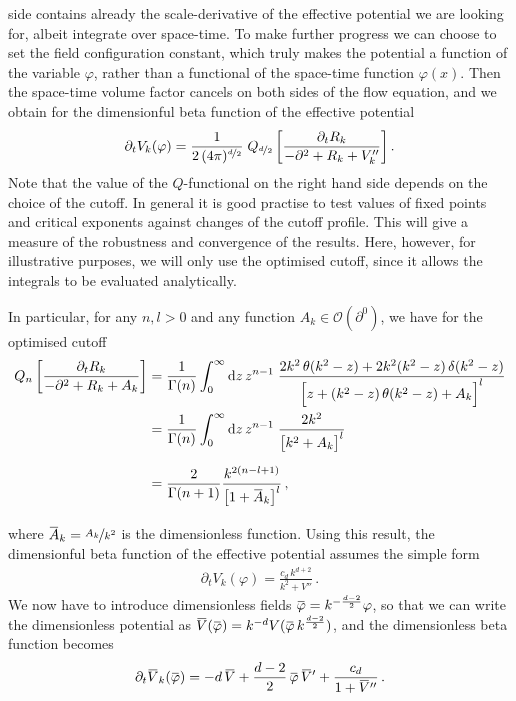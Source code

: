 \documentclass[11pt]{book}
\newcommand{\overbar}[1]{\mkern 1.5mu\overline{\mkern-1.5mu#1\mkern-1.5mu}\mkern 1.5mu}
\newcommand{\bV}{\overbar V}
\newcommand{\bp}{\overbar \varphi}
\numberwithin{equation}{chapter}
\begin{document}
side contains already the scale-derivative of the effective potential we
are looking for, albeit integrate over space-time.
To make further progress
we can choose to set the field configuration constant,
which truly makes the potential a function of the variable $\varphi$,
rather than a functional of the space-time function $\varphi(x)$.
Then the space-time volume factor cancels on both sides of the flow
equation, and we obtain for the dimensionful beta function of the
effective potential
\begin{align}
  \partial_t V_k (\varphi) =
  \frac{1}{ 2 \,(4\pi)^{\nicefrac d2} } \;
  Q_{\nicefrac{d}{2}}
  \left[
    \frac{ \partial_t R_k }{ -\partial^2 + R_k + V_k'' }
  \right] .
\end{align}
Note that the value of the $Q$-functional on the right hand side
depends on the choice of
the cutoff.
In general it is good practise to test values
of fixed points and critical exponents against changes of the cutoff profile.
This will give a measure of the robustness and convergence of the results.
Here, however, for illustrative purposes,
we will only use the optimised cutoff, since it allows
the integrals to be evaluated analytically.

In particular, for any $n,l>0$ and any function $A_k \in \mathcal O (\partial^0)$,
we have for the optimised cutoff
\begin{align}
  Q_{n}
  \left[
    \frac{ \partial_t R_k }{ -\partial^2 + R_k + A_k }
  \right]
  &=
  \frac{ 1 }{ \Gamma(n) }
  \int_0^\infty \mathrm dz \, z^{n-1} \;
  \frac{ 2 k^2 \, \theta (k^2-z) + 2 k^2 (k^2-z) \, \delta (k^2-z) }
  { \Big[ z + (k^2-z) \, \theta (k^2-z) + A_k \Big]^l } \nonumber \\
  &=
  \vphantom{
    \frac{ 2 k^2 \, \theta (k^2-z) + 2 k^2 (k^2-z) \, \delta (k^2-z) }
    { \Big[ z + (k^2-z) \, \theta (k^2-z) + A_k \Big]^l }
  }
  \frac{ 1 }{ \Gamma(n) }
  \int_0^\infty \mathrm dz \, z^{n-1} \;
  \frac{ 2 k^2 }{ \big[ k^2 + A_k \big] ^ l } \nonumber \\
  &=
  \vphantom{
    \frac{ 2 k^2 \, \theta (k^2-z) + 2 k^2 (k^2-z) \, \delta (k^2-z) }
    { \Big[ z + (k^2-z) \, \theta (k^2-z) + A_k \Big]^l }
  }
  \frac{ 2 }{ \Gamma(n+1) }
  \frac{ k^{2(n-l+1)} }{ \big[ 1 + \overbar A_k \big] ^ l } \,,
  \label{eq:Qfuncoptcutoff}
\end{align}
where $\overbar A_k = \nicefrac{A_k}{k^2}$ is the dimensionless function.
Using this result, the dimensionful beta function of the effective
potential assumes the simple form
\begin{align}
  \partial_t V_k (\varphi) =
  \frac{ c_d \, k^{d+2} }{ k^2 + V'' } \,.
\end{align}
We now have to introduce dimensionless fields
$\bp = k^{ - \frac{d-2}{2} } \varphi$, so that
we can write the dimensionless potential
as $\overbar V(\bp) = k^{-d} V(\bp \, k^{\frac{d-2}{2} })$,
and the dimensionless beta function becomes
\begin{align}
  \partial_t \overbar V_k (\bp) =
  -d \, \bV + \frac{d-2}{2} \, \bp \, \bV' + \frac{ c_d }{ 1 + \overbar V '' } \,.
\end{align}
\end{document}
